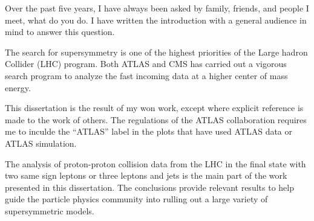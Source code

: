 

Over the past five years, 
I have always been asked by family, friends, 
and people I meet, what do you do.
I have written the introduction with a general audience in mind to answer this
question.

The search for supersymmetry is one of the highest priorities of the 
Large hadron Collider (LHC) program. Both ATLAS and CMS has carried out a 
vigorous search program to analyze the fast incoming data at a higher 
center of mass energy. 

This dissertation is the result of my won work, except where explicit 
reference is made to the work of others. 
The regulations of the ATLAS collaboration requires me to inculde 
the ``ATLAS'' label in the plots that have used ATLAS data or 
ATLAS simulation. 


The analysis of proton-proton collision data from the LHC in the final state 
with two same sign leptons or three leptons and jets is the main part of the 
work presented in this dissertation. 
The conclusions provide relevant results to help guide the particle physics 
community into rulling out a large variety of supersymmetric models. 
